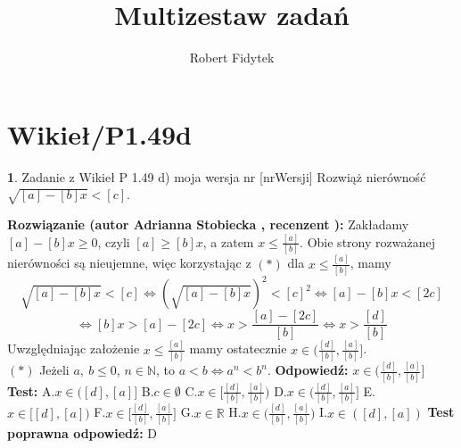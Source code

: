 \documentclass[12pt, a4paper]{article}
\title{Multizestaw zadań}
\author{Robert Fidytek}
\date{}
\theoremstyle{definition} %
\newtheorem{zad}{}
\newcommand{\kategoria}[1]{\section{#1}} %
\newcommand{\zadStart}[1]{\begin{zad}#1\newline} %
\newcommand{\zadStop}{\end{zad}}   %
\newcommand{\rozwStart}[2]{\noindent \textbf{Rozwiązanie (autor #1 , recenzent #2): }\newline} %
\newcommand{\rozwStop}{\newline}                                            %
\newcommand{\odpStart}{\noindent \textbf{Odpowiedź:}\newline}    %
\newcommand{\odpStop}{\newline}                                             %
\newcommand{\testStart}{\noindent \textbf{Test:}\newline} %
\newcommand{\testStop}{\newline} %
\newcommand{\kluczStart}{\noindent \textbf{Test poprawna odpowiedź:}\newline} %
\newcommand{\kluczStop}{\newline} %
\begin{document}
\maketitle


\kategoria{Wikieł/P1.49d}
\zadStart{Zadanie z Wikieł P 1.49 d) moja wersja nr [nrWersji]}
Rozwiąż nierówność $\sqrt{[a]-[b]x}<[c]$.
\zadStop
\rozwStart{Adrianna Stobiecka}{}
Zakładamy $[a]-[b]x\geq0$, czyli $[a]\geq[b]x$, a zatem $x\leq\frac{[a]}{[b]}$. Obie strony rozważanej nierówności są nieujemne, więc korzystając z $(*)$ dla $x\leq\frac{[a]}{[b]}$, mamy
$$\sqrt{[a]-[b]x}<[c]\Leftrightarrow(\sqrt{[a]-[b]x})^2<[c]^2\Leftrightarrow[a]-[b]x<[2c]$$
$$\Leftrightarrow[b]x>[a]-[2c]\Leftrightarrow x>\frac{[a]-[2c]}{[b]}\Leftrightarrow x>\frac{[d]}{[b]}$$
Uwzględniając założenie $x\leq\frac{[a]}{[b]}$ mamy ostatecznie $x\in\bigg(\frac{[d]}{[b]},\frac{[a]}{[b]}\bigg]$.
\\$(*)$ Jeżeli $a,~b\leq0$, $n\in\mathbb{N}$, to $a<b\Leftrightarrow a^n<b^n$.
\rozwStop
\odpStart
 $x\in\bigg(\frac{[d]}{[b]},\frac{[a]}{[b]}\bigg]$
\odpStop
\testStart
A.$x\in([d],[a]]$
B.$c\in\emptyset$
C.$x\in\bigg[\frac{[d]}{[b]},\frac{[a]}{[b]}\bigg)$
D.$x\in\bigg(\frac{[d]}{[b]},\frac{[a]}{[b]}\bigg]$
E.$x\in[[d],[a])$
F.$x\in\bigg[\frac{[d]}{[b]},\frac{[a]}{[b]}\bigg]$
G.$x\in\mathbb{R}$
H.$x\in\bigg(\frac{[d]}{[b]},\frac{[a]}{[b]}\bigg)$
I.$x\in([d],[a])$
\testStop
\kluczStart
D
\kluczStop
\end{document}
